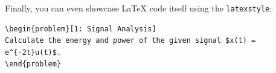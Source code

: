 Finally, you can even showcase LaTeX code itself using the \texttt{latexstyle}:

\begin{lstlisting}[style=latexstyle, caption={A snippet of LaTeX code.}]
\begin{problem}[1: Signal Analysis]
Calculate the energy and power of the given signal $x(t) = e^{-2t}u(t)$.
\end{problem}
\end{lstlisting}

\newpage